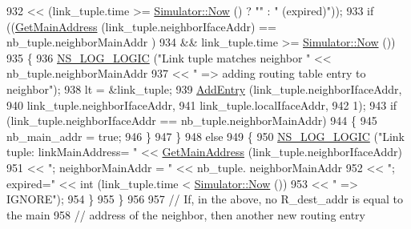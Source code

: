 \begin{DoxyCode}
932                                                       << (link\_tuple.time >= 
      \hyperlink{classns3_1_1Simulator_ac3178fa975b419f7875e7105be122800}{Simulator::Now} () ? \textcolor{stringliteral}{""} : \textcolor{stringliteral}{" (expired)"}));
933               \textcolor{keywordflow}{if} ((\hyperlink{classns3_1_1olsr_1_1RoutingProtocol_ae01451170fb389d322b33ed6d954f460}{GetMainAddress} (link\_tuple.neighborIfaceAddr) == nb\_tuple.neighborMainAddr
      )
934                   && link\_tuple.time >= \hyperlink{classns3_1_1Simulator_ac3178fa975b419f7875e7105be122800}{Simulator::Now} ())
935                 \{
936                   \hyperlink{group__logging_ga88acd260151caf2db9c0fc84997f45ce}{NS\_LOG\_LOGIC} (\textcolor{stringliteral}{"Link tuple matches neighbor "} << nb\_tuple.neighborMainAddr
937                                                                << \textcolor{stringliteral}{" => adding routing table entry to
       neighbor"});
938                   lt = &link\_tuple;
939                   \hyperlink{classns3_1_1olsr_1_1RoutingProtocol_a6ddb7dd3a6584b7d88dc5a41a61b1494}{AddEntry} (link\_tuple.neighborIfaceAddr,
940                             link\_tuple.neighborIfaceAddr,
941                             link\_tuple.localIfaceAddr,
942                             1);
943                   \textcolor{keywordflow}{if} (link\_tuple.neighborIfaceAddr == nb\_tuple.neighborMainAddr)
944                     \{
945                       nb\_main\_addr = \textcolor{keyword}{true};
946                     \}
947                 \}
948               \textcolor{keywordflow}{else}
949                 \{
950                   \hyperlink{group__logging_ga88acd260151caf2db9c0fc84997f45ce}{NS\_LOG\_LOGIC} (\textcolor{stringliteral}{"Link tuple: linkMainAddress= "} << 
      \hyperlink{classns3_1_1olsr_1_1RoutingProtocol_ae01451170fb389d322b33ed6d954f460}{GetMainAddress} (link\_tuple.neighborIfaceAddr)
951                                                                 << \textcolor{stringliteral}{"; neighborMainAddr =  "} << nb\_tuple.
      neighborMainAddr
952                                                                 << \textcolor{stringliteral}{"; expired="} << int (link\_tuple.time < 
      \hyperlink{classns3_1_1Simulator_ac3178fa975b419f7875e7105be122800}{Simulator::Now} ())
953                                                                 << \textcolor{stringliteral}{" => IGNORE"});
954                 \}
955             \}
956 
957           \textcolor{comment}{// If, in the above, no R\_dest\_addr is equal to the main}
958           \textcolor{comment}{// address of the neighbor, then another new routing entry}

\end{DoxyCode}
